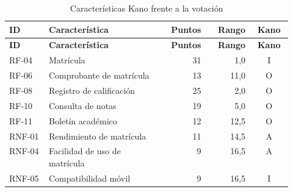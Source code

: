 \begingroup
\small
\begin{longtable}{@{}p{0.14\linewidth}p{0.40\linewidth}rrc@{}}
\caption{Características Kano frente a la votación}\label{tab:comparacion-kano-votos}\\
\toprule
\textbf{ID} & \textbf{Característica} & \textbf{Puntos} & \textbf{Rango} & \textbf{Kano}\\
\midrule
\endfirsthead
\toprule
\textbf{ID} & \textbf{Característica} & \textbf{Puntos} & \textbf{Rango} & \textbf{Kano}\\
\midrule
\endhead
\bottomrule
\endlastfoot
RF-04 & Matrícula & 31 & 1,0 & I\\
RF-06 & Comprobante de matrícula & 13 & 11,0 & O\\
RF-08 & Registro de calificación & 25 & 2,0 & O\\
RF-10 & Consulta de notas & 19 & 5,0 & O\\
RF-11 & Boletín académico & 12 & 12,5 & O\\
RNF-01 & Rendimiento de matrícula & 11 & 14,5 & A\\
RNF-04 & Facilidad de uso de matrícula & 9 & 16,5 & A\\
RNF-05 & Compatibilidad móvil & 9 & 16,5 & I\\
\end{longtable}
\endgroup
